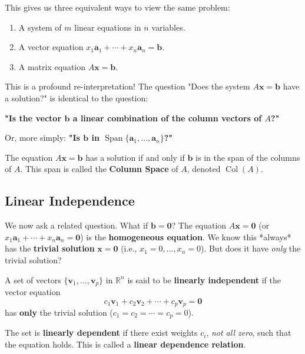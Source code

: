 This gives us three equivalent ways to view the same problem:
\begin{enumerate}
    \item A system of $m$ linear equations in $n$ variables.
    \item A vector equation $x_1\mathbf{a}_1 + \cdots + x_n\mathbf{a}_n = \mathbf{b}$.
    \item A matrix equation $A\mathbf{x} = \mathbf{b}$.
\end{enumerate}

This is a profound re-interpretation! The question "Does the system $A\mathbf{x} = \mathbf{b}$ have a solution?" is identical to the question:

\begin{center}
\textbf{"Is the vector $\mathbf{b}$ a linear combination of the column vectors of $A$?"}
\end{center}
Or, more simply: \textbf{"Is $\mathbf{b}$ in $\operatorname{Span}\{\mathbf{a}_1, \ldots, \mathbf{a}_n\}$?"}

\begin{theorem}
The equation $A\mathbf{x} = \mathbf{b}$ has a solution if and only if $\mathbf{b}$ is in the span of the columns of $A$. This span is called the \textbf{Column Space} of $A$, denoted $\operatorname{Col}(A)$.
\end{theorem}

\subsection{Linear Independence}
We now ask a related question. What if $\mathbf{b} = \mathbf{0}$?
The equation $A\mathbf{x} = \mathbf{0}$ (or $x_1\mathbf{a}_1 + \cdots + x_n\mathbf{a}_n = \mathbf{0}$) is the \textbf{homogeneous equation}.
We know this *always* has the \textbf{trivial solution} $\mathbf{x} = \mathbf{0}$ (i.e., $x_1=0, \ldots, x_n=0$).
But does it have \emph{only} the trivial solution?

\begin{definition}
A set of vectors $\{\mathbf{v}_1, \ldots, \mathbf{v}_p\}$ in $\mathbb{R}^n$ is said to be \textbf{linearly independent} if the vector equation
\[ c_1\mathbf{v}_1 + c_2\mathbf{v}_2 + \cdots + c_p\mathbf{v}_p = \mathbf{0} \]
has \textbf{only} the trivial solution ($c_1 = c_2 = \cdots = c_p = 0$).

The set is \textbf{linearly dependent} if there exist weights $c_i$, \emph{not all zero}, such that the equation holds. This is called a \textbf{linear dependence relation}.
\end{definition}

